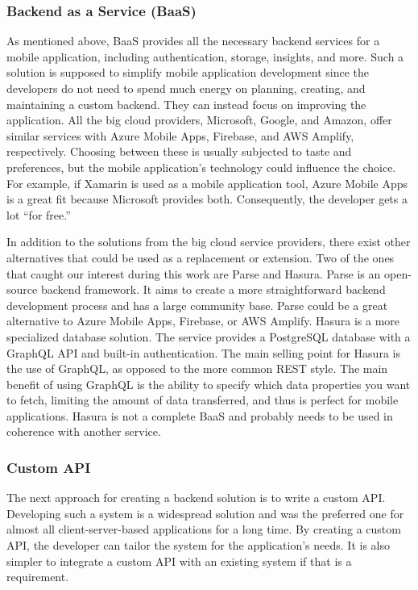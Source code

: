 \subsubsection{Backend as a Service (BaaS)}
As mentioned above, BaaS provides all the necessary backend services for a mobile application, including authentication, storage, insights, and more. Such a solution is supposed to simplify mobile application development since the developers do not need to spend much energy on planning, creating, and maintaining a custom backend. They can instead focus on improving the application. All the big cloud providers, Microsoft, Google, and Amazon, offer similar services with Azure Mobile Apps, Firebase, and AWS Amplify, respectively. Choosing between these is usually subjected to taste and preferences, but the mobile application’s technology could influence the choice. For example, if Xamarin is used as a mobile application tool, Azure Mobile Apps is a great fit because Microsoft provides both. Consequently, the developer gets a lot “for free.”

In addition to the solutions from the big cloud service providers, there exist other alternatives that could be used as a replacement or extension. Two of the ones that caught our interest during this work are Parse and Hasura. Parse is an open-source backend framework. It aims to create a more straightforward backend development process and has a large community base. Parse could be a great alternative to Azure Mobile Apps, Firebase, or AWS Amplify. Hasura is a more specialized database solution. The service provides a PostgreSQL database with a GraphQL API and built-in authentication. The main selling point for Hasura is the use of GraphQL, as opposed to the more common REST style. The main benefit of using GraphQL is the ability to specify which data properties you want to fetch, limiting the amount of data transferred, and thus is perfect for mobile applications. Hasura is not a complete BaaS and probably needs to be used in coherence with another service.

\subsubsection{Custom API}
The next approach for creating a backend solution is to write a custom API. Developing such a system is a widespread solution and was the preferred one for almost all client-server-based applications for a long time. By creating a custom API, the developer can tailor the system for the application’s needs. It is also simpler to integrate a custom API with an existing system if that is a requirement. 

